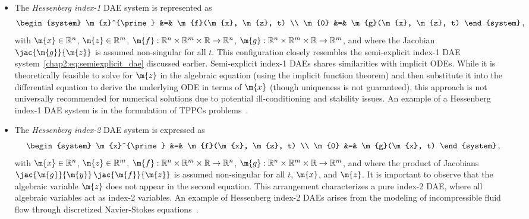\begin{itemize}
  \setlength\itemsep{0.0em}
  \item The \emph{Hessenberg index-1} \ac{DAE} system is represented as
  \begin{equation*}
    \begin{system}
      \m{x}^{\prime} &=& \m{f}(\m{x}, \m{z}, t) \\
      \m{0}          &=& \m{g}(\m{x}, \m{z}, t)
    \end{system} \, \text{,}
  \end{equation*}
  with $\m{x} \in \mathbb{R}^n$, $\m{z} \in \mathbb{R}^m$, $\m{f}: \mathbb{R}^{n} \times \mathbb{R}^{m} \times \mathbb{R} \rightarrow \mathbb{R}^{n}$, $\m{g}: \mathbb{R}^{n} \times \mathbb{R}^{m} \times \mathbb{R} \rightarrow \mathbb{R}^{m}$, and where the Jacobian $\jac{\m{g}}{\m{z}}$ is assumed non-singular for all $t$. This configuration closely resembles the semi-explicit index-1 \ac{DAE} system~\eqref{chap2:eq:semiexplicit_dae} discussed earlier. Semi-explicit index-1 \acp{DAE} shares similarities with implicit \acp{ODE}. While it is theoretically feasible to solve for $\m{z}$ in the algebraic equation (using the implicit function theorem) and then substitute it into the differential equation to derive the underlying \ac{ODE} in terms of $\m{x}$ (though uniqueness is not guaranteed), this approach is not universally recommended for numerical solutions due to potential ill-conditioning and stability issues. An example of a Hessenberg index-1 \ac{DAE} system is in the formulation of \acp{TPPC} problems~\cite{brenan1995numerical}.
  \item The \emph{Hessenberg index-2} \ac{DAE} system is expressed as
  \begin{equation*}
    \begin{system}
      \m{x}^{\prime} &=& \m{f}(\m{x}, \m{z}, t) \\
      \m{0}          &=& \m{g}(\m{x}, t)
    \end{system} \, \text{,}
  \end{equation*}
  with $\m{x} \in \mathbb{R}^n$, $\m{z} \in \mathbb{R}^m$, $\m{f}: \mathbb{R}^{n} \times \mathbb{R}^{m} \times \mathbb{R} \rightarrow \mathbb{R}^{n}$, $\m{g}: \mathbb{R}^{n} \times \mathbb{R}^{m} \times \mathbb{R} \rightarrow \mathbb{R}^{m}$, and where the product of Jacobians $\jac{\m{g}}{\m{y}} \, \jac{\m{f}}{\m{z}}$ is assumed non-singular for all $t$, $\m{x}$, and $\m{z}$. It is important to observe that the algebraic variable $\m{z}$ does not appear in the second equation. This arrangement characterizes a pure index-2 \ac{DAE}, where all algebraic variables act as index-2 variables. An example of Hessenberg index-2 \acp{DAE} arises from the modeling of incompressible fluid flow through discretized Navier-Stokes equations~\cite{ascher1998computer}.

\end{itemize}
